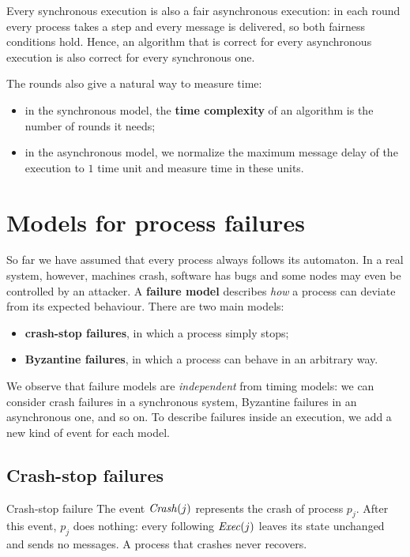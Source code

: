 \begin{framedobs}{}
  Every synchronous execution is also a fair asynchronous execution: in each round every process takes a step and every message is delivered, so both fairness conditions hold. Hence, an algorithm that is correct for every asynchronous execution is also correct for every synchronous one.
\end{framedobs}

The rounds also give a natural way to measure time:
\begin{itemize}
  \item in the synchronous model, the \textbf{time complexity} of an algorithm is the number of rounds it needs;
  \item in the asynchronous model, we normalize the maximum message delay of the execution to $1$ time unit and measure time in these units.
\end{itemize}

\section{Models for process failures}

So far we have assumed that every process always follows its automaton. In a real system, however, machines crash, software has bugs and some nodes may even be controlled by an attacker. A \textbf{failure model} describes \textit{how} a process can deviate from its expected behaviour. There are two main models:
\begin{itemize}
  \item \textbf{crash-stop failures}, in which a process simply stops;
  \item \textbf{Byzantine failures}, in which a process can behave in an arbitrary way.
\end{itemize}

We observe that failure models are \textit{independent} from timing models: we can consider crash failures in a synchronous system, Byzantine failures in an asynchronous one, and so on. To describe failures inside an execution, we add a new kind of event for each model.

\subsection{Crash-stop failures}

\begin{frameddefn}{Crash-stop failure}
  The event $\mathit{Crash}(j)$ represents the crash of process $p_j$. After this event, $p_j$ does nothing: every following $\mathit{Exec}(j)$ leaves its state unchanged and sends no messages. A process that crashes never recovers.
\end{frameddefn}

